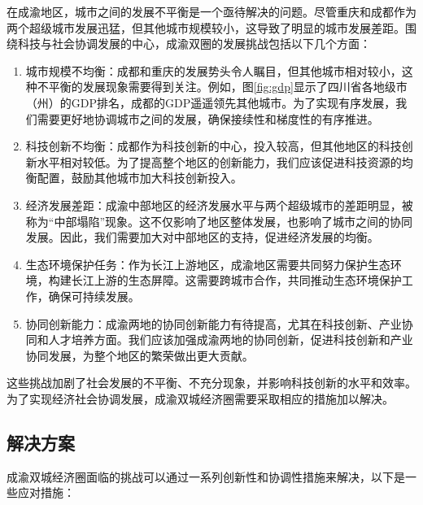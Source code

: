 \documentclass{CjC}
\begin{document}
在成渝地区，城市之间的发展不平衡是一个亟待解决的问题。尽管重庆和成都作为两个超级城市发展迅猛，但其他城市规模较小，这导致了明显的城市发展差距。围绕科技与社会协调发展的中心，成渝双圈的发展挑战包括以下几个方面：

\begin{enumerate}
    \item 城市规模不均衡：成都和重庆的发展势头令人瞩目，但其他城市相对较小，这种不平衡的发展现象需要得到关注\cite{姚作林2017成渝经济区城市群空间结构要素特征分析}。例如，图\ref{fig:gdp}显示了四川省各地级市（州）的GDP排名，成都的GDP遥遥领先其他城市。为了实现有序发展，我们需要更好地协调城市之间的发展，确保接续性和梯度性的有序推进。
    \item 科技创新不均衡：成都作为科技创新的中心，投入较高，但其他地区的科技创新水平相对较低\cite{李兰兰2011中国各省市科技进步贡献率测算的实证研究}。为了提高整个地区的创新能力，我们应该促进科技资源的均衡配置，鼓励其他城市加大科技创新投入。
    \item 经济发展差距：成渝中部地区的经济发展水平与两个超级城市的差距明显，被称为“中部塌陷”现象。这不仅影响了地区整体发展，也影响了城市之间的协同发展\cite{邓祥征2013中国西部城镇化可持续发展路径的探讨}。因此，我们需要加大对中部地区的支持，促进经济发展的均衡。
    \item 生态环境保护任务：作为长江上游地区，成渝地区需要共同努力保护生态环境，构建长江上游的生态屏障。这需要跨城市合作，共同推动生态环境保护工作，确保可持续发展\cite{赵伟2021成渝地区双城经济圈生态安全格局构建}。
    \item 协同创新能力：成渝两地的协同创新能力有待提高，尤其在科技创新、产业协同和人才培养方面。我们应该加强成渝两地的协同创新，促进科技创新和产业协同发展，为整个地区的繁荣做出更大贡献。
\end{enumerate}

这些挑战加剧了社会发展的不平衡、不充分现象，并影响科技创新的水平和效率。为了实现经济社会协调发展，成渝双城经济圈需要采取相应的措施加以解决。

\subsection{解决方案}

成渝双城经济圈面临的挑战可以通过一系列创新性和协调性措施来解决，以下是一些应对措施：
\end{document}
